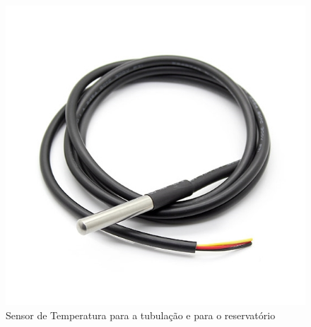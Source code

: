 \begin{figure}[!htb]                   
	\centering                          
	\includegraphics[scale=0.5]{figuras/Figura4.jpg}
	\caption{Sensor de Temperatura para a tubulação e para o reservatório}               
\end{figure}
	
	
